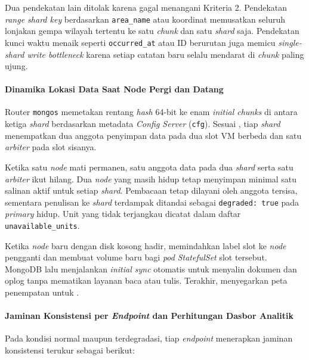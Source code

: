 Dua pendekatan lain ditolak karena gagal menangani Kriteria 2. Pendekatan \textit{range shard key} berdasarkan \texttt{area\_name} atau koordinat memusatkan seluruh lonjakan gempa wilayah tertentu ke satu \textit{chunk} dan satu \textit{shard} saja. Pendekatan kunci waktu menaik seperti \texttt{occurred\_at} atau ID berurutan juga memicu \textit{single-shard write bottleneck} karena setiap catatan baru selalu mendarat di \textit{chunk} paling ujung.

\paragraph*{Dinamika Lokasi Data Saat Node Pergi dan Datang}
Router \texttt{mongos} memetakan rentang \textit{hash} 64-bit ke enam \textit{initial chunks} di antara ketiga \textit{shard} berdasarkan metadata \textit{Config Server} (\texttt{cfg}). Sesuai , tiap \textit{shard} menempatkan dua anggota penyimpan data pada dua slot VM berbeda dan satu \textit{arbiter} pada slot sisanya.

Ketika satu \textit{node} mati permanen, satu anggota data pada dua \textit{shard} serta satu \textit{arbiter} ikut hilang. Dua \textit{node} yang masih hidup tetap menyimpan minimal satu salinan aktif untuk setiap \textit{shard}. Pembacaan tetap dilayani oleh anggota tersisa, sementara penulisan ke \textit{shard} terdampak ditandai sebagai \texttt{degraded: true} pada \textit{primary} hidup. Unit yang tidak terjangkau dicatat dalam daftar \texttt{unavailable\_units}.

Ketika \textit{node} baru dengan disk kosong hadir,  memindahkan label slot ke \textit{node} pengganti dan membuat volume baru bagi \textit{pod} \textit{StatefulSet} slot tersebut. MongoDB lalu menjalankan \textit{initial sync} otomatis untuk menyalin dokumen dan oplog tanpa mematikan layanan baca atau tulis. Terakhir,  menyegarkan peta penempatan untuk .

\paragraph*{Jaminan Konsistensi per \textit{Endpoint} dan Perhitungan Dasbor Analitik}
Pada kondisi normal maupun terdegradasi, tiap \textit{endpoint} menerapkan jaminan konsistensi terukur sebagai berikut:

